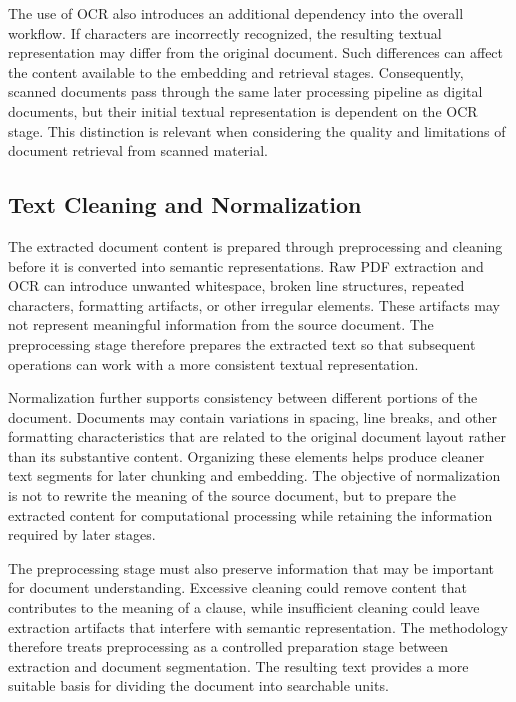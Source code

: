\documentclass[12pt,a4paper,oneside]{report}
\begin{document}
The use of OCR also introduces an additional dependency into the overall
workflow. If characters are incorrectly recognized, the resulting textual
representation may differ from the original document. Such differences can
affect the content available to the embedding and retrieval stages.
Consequently, scanned documents pass through the same later processing
pipeline as digital documents, but their initial textual representation is
dependent on the OCR stage. This distinction is relevant when considering
the quality and limitations of document retrieval from scanned material.

\subsection{Text Cleaning and Normalization}

The extracted document content is prepared through preprocessing and
cleaning before it is converted into semantic representations. Raw PDF
extraction and OCR can introduce unwanted whitespace, broken line
structures, repeated characters, formatting artifacts, or other irregular
elements. These artifacts may not represent meaningful information from the
source document. The preprocessing stage therefore prepares the extracted
text so that subsequent operations can work with a more consistent textual
representation.

Normalization further supports consistency between different portions of
the document. Documents may contain variations in spacing, line breaks, and
other formatting characteristics that are related to the original document
layout rather than its substantive content. Organizing these elements helps
produce cleaner text segments for later chunking and embedding. The
objective of normalization is not to rewrite the meaning of the source
document, but to prepare the extracted content for computational processing
while retaining the information required by later stages.

The preprocessing stage must also preserve information that may be
important for document understanding. Excessive cleaning could remove
content that contributes to the meaning of a clause, while insufficient
cleaning could leave extraction artifacts that interfere with semantic
representation. The methodology therefore treats preprocessing as a
controlled preparation stage between extraction and document segmentation.
The resulting text provides a more suitable basis for dividing the document
into searchable units.
\end{document}
